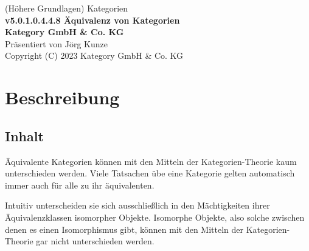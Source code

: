 \documentclass[a4paper]{amsart}
\theoremstyle{definition}
\begin{document}
\begin{titlepage}
\centering
{\huge
(Höhere Grundlagen) Kategorien\\[1cm]
\textbf{v5.0.1.0.4.4.8 Äquivalenz von Kategorien}
}\\[1cm]

\textbf{Kategory GmbH \& Co. KG}\\
Präsentiert von Jörg Kunze\\
Copyright (C) 2023 Kategory GmbH \& Co. KG

\end{titlepage}

%

\newpage

\section*{Beschreibung}

\subsection*{Inhalt}
Äquivalente Kategorien können mit den Mitteln der Kategorien-Theorie kaum unterschieden werden. Viele Tatsachen übe eine Kategorie gelten automatisch immer auch für alle zu ihr äquivalenten.

Intuitiv unterscheiden sie sich ausschließlich in den Mächtigkeiten ihrer Äquivalenzklassen isomorpher Objekte. Isomorphe Objekte, also solche zwischen denen es einen Isomorphismus gibt, können mit den Mitteln der Kategorien-Theorie gar nicht unterschieden werden.
\end{document}

